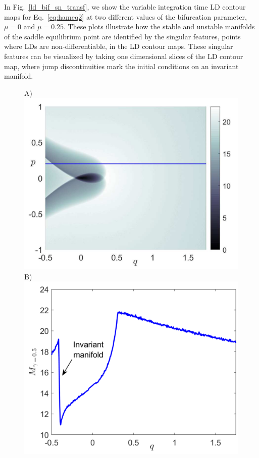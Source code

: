 \documentclass{ws-ijbc}
\begin{document}
In Fig.~\ref{ld_bif_sn_transf}, we show the variable integration time LD contour maps for Eq.~\eqref{eq:hameq2} at two different values of the bifurcation parameter, $\mu = 0$ and $\mu = 0.25$. These plots illustrate how the stable and unstable manifolds of the saddle equilibrium point are identified by the singular features, points where LDs are non-differentiable, in the LD contour maps. These singular features can be visualized by taking one dimensional slices of the LD contour map, where jump discontinuities mark the initial conditions on an invariant manifold.

\begin{figure}[htbp]
	\begin{center}
		A)\includegraphics[scale=0.33]{fig2a}
		B)\includegraphics[scale=0.32]{fig2b}

\end{center}
\end{figure}
\end{document}
